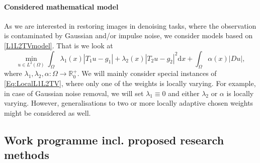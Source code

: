 \documentclass[enabledeprecatedfontcommands,cleardoublepage=empty,headsepline,twoside,11pt,DIV=15,BCOR=12mm,final]{scrartcl}
\newcommand{\R}{{\mathbb R}}
\begin{document}
\paragraph*{Considered mathematical model}

As we are interested in restoring images in denoising tasks, where the observation is contaminated by Gaussian and/or impulse noise, we consider models based on \eqref{L1L2TVmodel}. That is we look at 
\begin{equation}\label{Eq:LocalL1L2TV}
\min_{u\in L^2(\Omega)} \int_\Omega \lambda_1(x) | T_1 u - g_1| + \lambda_2(x) |T_2 u - g_2|^2 \text{d}x + \int_\Omega \alpha(x) |D u|, %
\end{equation}
where $\lambda_1,\lambda_2, \alpha :\Omega \to \R_0^+$. %
 We will mainly consider special instances of \eqref{Eq:LocalL1L2TV}, where only one of the weights is locally varying. For example, in case of Gaussian noise removal, we will set $\lambda_1\equiv 0$ and either $\lambda_2$ or $\alpha$ is locally varying. However, generalisations to two or more locally adaptive chosen weights might be considered as well. 


\subsection{Work programme incl. proposed research methods}
\label{sec:work-programme}
\end{document}
